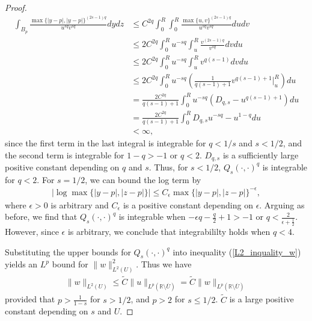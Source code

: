 \documentclass[preprint,12pt]{elsarticle}
\newcommand{\R}{\mathbb R}
\begin{document}
\begin{proof}
\begin{align}
        \int_{B_p}\frac{\max\{|y-p|,|y-p|\}^{(2s-1)q}}{u^{sq}v^{sq}}dydz&\leq C^{2q}\int_0^R\int_0^R\frac{\max\{u,v\}^{(2s-1)q}}{u^{sq}v^{sq}}dudv\nonumber\\
        &\leq 2C^{2q}\int_0^R u^{-sq}\int_u^R\frac{v^{(2s-1)q}}{v^{sq}}dvdu\nonumber\\
        &\leq 2C^{2q}\int_0^R u^{-sq}\int_u^R v^{q(s-1)}dvdu\nonumber\\
        &\leq 2C^{2q}\int_0^R u^{-sq}\left(\frac{1}{q(s-1)+1} v^{q(s-1)+1}\Big|_u^R\right)du\nonumber\\
        &=\frac{2C^{2q}}{q(s-1)+1}\int_0^R u^{-sq}\left(D_{q,s}-u^{q(s-1)+1}\right)du\nonumber\\
        &=\frac{2C^{2q}}{q(s-1)+1}\int_0^R D_{q,s}u^{-sq}-u^{1-q}du\nonumber\\
        &<\infty,
    \end{align}
    since the first term in the last integral is integrable for $q<1/s$ and $s<1/2$, and the second term is integrable for $1-q>-1$ or $q<2$. $D_{q,s}$ is a sufficiently large positive constant depending on $q$ and $s$. Thus, for $s<1/2$, $Q_s(\cdot,\cdot)^q$ is integrable for $q<2$. For $s=1/2$, we can bound the log term by
    \begin{align*}
        |\log\max\{|y-p|,|z-p|\}|\leq C_\epsilon\max\{|y-p|,|z-p|\}^{-\epsilon},
    \end{align*}
    where $\epsilon>0$ is arbitrary and $C_\epsilon$ is a positive constant depending on $\epsilon$. Arguing as before, we find that $Q_s(\cdot,\cdot)^q$ is integrable when $-\epsilon q-\frac{q}{2}+1>-1$ or $q<\frac{2}{\epsilon+\frac{1}{2}}$. However, since $\epsilon$ is arbitrary, we conclude that integrabililty holds when $q<4$.
    
    Substituting the upper bounds for $Q_s(\cdot,\cdot)^q$ into inequality (\ref{L2_inquality_w}) yields an $L^p$ bound for $\|w\|^2_{L^2(U)}$. Thus we have
    \begin{align}\label{LP_bound_w} 
        \|w\|_{L^2(U)}\leq \tilde{C}\|u\|_{L^p(\R\setminus\overline{U})}=\tilde{C}\|w\|_{L^p(\R\setminus\overline{U})}
    \end{align}
    provided that $p>\frac{1}{1-s}$ for $s>1/2$, and $p>2$ for $s\leq 1/2$. $\tilde{C}$ is a large positive constant depending on $s$ and $U$.  
\end{proof}
\end{document}
